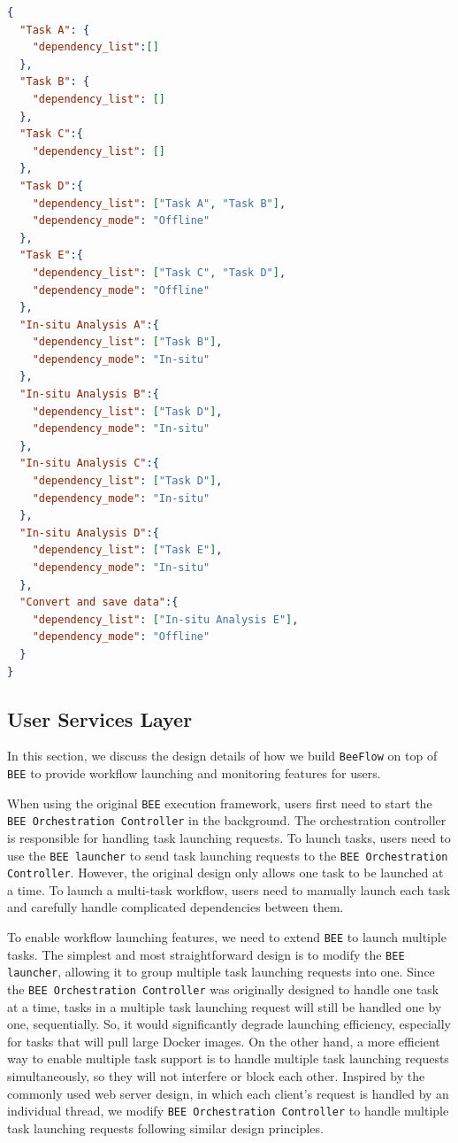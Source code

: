 \begin{lstlisting}[language=json,firstnumber=1,basicstyle=\small]
{
  "Task A": { 
    "dependency_list":[]
  },
  "Task B": { 
    "dependency_list": []
  },
  "Task C":{  
    "dependency_list": []
  },
  "Task D":{  
    "dependency_list": ["Task A", "Task B"],
    "dependency_mode": "Offline"
  },
  "Task E":{  
    "dependency_list": ["Task C", "Task D"],
    "dependency_mode": "Offline"
  },
  "In-situ Analysis A":{ 
    "dependency_list": ["Task B"],
    "dependency_mode": "In-situ" 
  },
  "In-situ Analysis B":{ 
    "dependency_list": ["Task D"],
    "dependency_mode": "In-situ"
  },
  "In-situ Analysis C":{ 
    "dependency_list": ["Task D"],
    "dependency_mode": "In-situ"
  },
  "In-situ Analysis D":{ 
    "dependency_list": ["Task E"],
    "dependency_mode": "In-situ"
  },
  "Convert and save data":{ 
    "dependency_list": ["In-situ Analysis E"],
    "dependency_mode": "Offline"
  }  
}
\end{lstlisting}


\subsection{User Services Layer}
In this section, we discuss the design details of how we build \texttt{BeeFlow} on top of \texttt{BEE} to provide workflow launching and monitoring features for users. 

When using the original \texttt{BEE} execution framework, users first need to start the \texttt{BEE Orchestration Controller} in the background. The orchestration controller is responsible for handling task launching requests. To launch tasks, users need to use the \texttt{BEE launcher} to send task launching requests to the \texttt{BEE Orchestration Controller}. However, the original design only allows one task to be launched at a time. To launch a multi-task workflow, users need to manually launch each task and carefully handle complicated dependencies between them. 

To enable workflow launching features, we need to extend \texttt{BEE} to launch multiple tasks. The simplest and most straightforward design is to modify the \texttt{BEE launcher}, allowing it to group multiple task launching requests into one. Since the \texttt{BEE Orchestration Controller} was originally designed to handle one task at a time, tasks in a multiple task launching request will still be handled one by one, sequentially. So, it would significantly degrade launching efficiency, especially for tasks that will pull large Docker images. On the other hand, a more efficient way to enable multiple task support is to handle multiple task launching requests simultaneously, so they will not interfere or block each other. Inspired by the commonly used web server design, in which each client's request is handled by an individual thread, we modify \texttt{BEE Orchestration Controller} to handle multiple task launching requests following similar design principles. 


